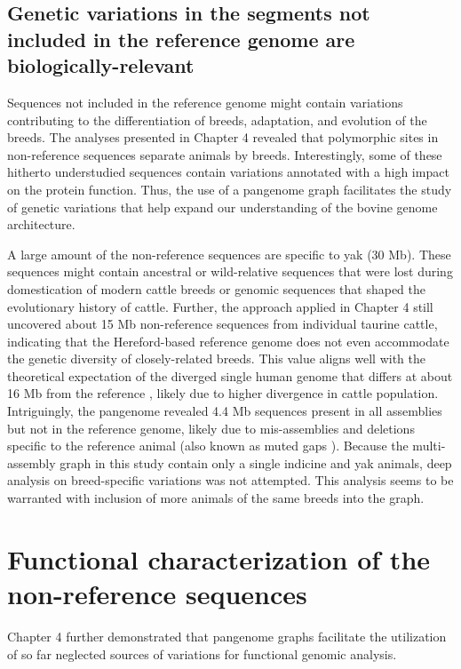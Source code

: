 \documentclass[../main.tex]{subfiles}
\begin{document}
\subsection*{Genetic variations in the segments not included in the reference genome are biologically-relevant}

Sequences not included in the reference genome might contain variations contributing to the differentiation of breeds, adaptation, and evolution of the breeds. The analyses presented in Chapter 4 revealed that polymorphic sites in non-reference sequences separate animals by breeds. Interestingly, some of these hitherto understudied sequences contain variations annotated with a high impact on the protein function. Thus, the use of a pangenome graph facilitates the study of genetic variations that help expand our understanding of the bovine genome architecture. 

A large amount of the non-reference sequences are specific to yak (30 Mb). These sequences might contain  ancestral or wild-relative sequences that were lost during domestication of modern cattle breeds or genomic sequences that shaped the evolutionary history of cattle. Further, the approach applied in Chapter 4 still uncovered  about 15 Mb non-reference sequences from individual taurine cattle, indicating that the Hereford-based reference genome does not even accommodate the genetic diversity of closely-related breeds. This value aligns well with the theoretical expectation of the diverged single human genome that differs at about 16 Mb from the reference \citep{huddleston2017discovery}, likely due to higher divergence in cattle population. Intriguingly, the pangenome revealed 4.4 Mb sequences present in all assemblies but not in the reference genome, likely due to mis-assemblies and deletions specific to the reference animal (also known as muted gaps \citep{audano2019characterizing}). Because the multi-assembly graph in this study contain only a single indicine and yak animals, deep analysis on breed-specific variations was not attempted. This analysis seems to be warranted with inclusion of more animals of the same breeds into the graph.

\section{Functional characterization of the non-reference sequences}

Chapter 4 further demonstrated that pangenome graphs facilitate the utilization of so far neglected sources of variations for functional genomic analysis. 
\end{document}
